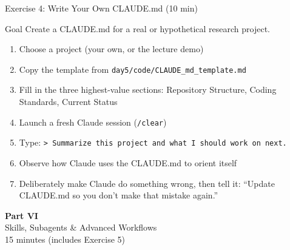 \documentclass[aspectratio=169,10pt]{beamer}
\newcommand{\emphc}[1]{\textcolor{harvardcrimson}{#1}}
\begin{document}
\begin{frame}[fragile]{Exercise 4: Write Your Own CLAUDE.md {\small(10 min)}}
\begin{exampleblock}{Goal}
Create a CLAUDE.md for a real or hypothetical research project.
\end{exampleblock}

\begin{enumerate}\itemsep2pt
    \item Choose a project (your own, or the lecture demo)
    \item Copy the template from \texttt{day5/code/CLAUDE\_md\_template.md}
    \item Fill in the \emphc{three highest-value sections}: Repository Structure, Coding Standards, Current Status
    \item Launch a fresh Claude session (\texttt{/clear})
    \item Type: \texttt{> Summarize this project and what I should work on next.}
    \item Observe how Claude uses the CLAUDE.md to orient itself
    \item Deliberately make Claude do something wrong, then tell it: ``Update CLAUDE.md so you don't make that mistake again.''
\end{enumerate}
\end{frame}


\begin{frame}{}
\vfill
\begin{center}
{\Huge \textcolor{uzhblue}{\textbf{Part VI}}}\\[12pt]
{\LARGE Skills, Subagents \& Advanced Workflows}\\[6pt]
{\small 15 minutes (includes Exercise 5)}
\end{center}
\vfill
\end{frame}
\end{document}
